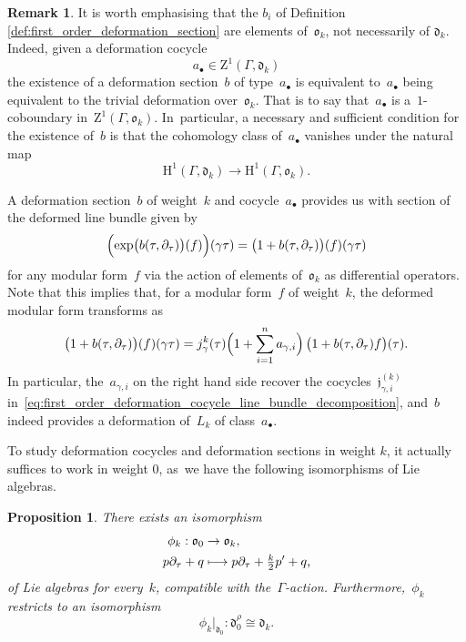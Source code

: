 \documentclass[10pt,a4paper]{article}
\numberwithin{equation}{section}
\let\oldbullet\bullet
\renewcommand{\bullet}{{\scriptscriptstyle\oldbullet}}
\theoremstyle{plain}
\newtheorem{proposition}[theoremcounter]{Proposition}
\theoremstyle{definition}
\newtheorem{remark}[theoremcounter]{Remark}
\newcommand{\tx}{\text}
\newcommand{\nbd}{\nobreakdash-\hspace{0pt}}
\newcommand{\frakd}{\ensuremath{\mathfrak{d}}}
\newcommand{\frakj}{\ensuremath{\mathfrak{j}}}
\newcommand{\frako}{\ensuremath{\mathfrak{o}}}
\newcommand{\rmH}{\ensuremath{\mathrm{H}}}
\newcommand{\rmZ}{\ensuremath{\mathrm{Z}}}
\newcommand{\defcol}{\mathrel{:}}
\let\Ga\Gamma
\let\ga\gamma
\newcommand\mto{\mathchoice{\longmapsto}{\mapsto}{\mapsto}{\mapsto}}
\begin{document}
\begin{remark}
It is worth emphasising that the $b_i$ of Definition \ref{def:first_order_deformation_section} are elements of~$\frako_k$, not necessarily of $\frakd_k$. Indeed, given a deformation cocycle
\begin{equation*}a_\bullet\in \rmZ^1(\Ga,\frakd_k)\end{equation*}
the existence of a deformation section~$b$ of type~$a_\bullet$ is equivalent to~$a_\bullet$ being equivalent to the trivial deformation over~$\frako_k$. That is to say that~$a_\bullet$ is a~$1$-coboundary in~$\rmZ^1(\Ga,\frako_k)$. In~particular, a necessary and sufficient condition for the existence of~$b$ is that the cohomology class of~$a_\bullet$ vanishes under the natural map
\begin{equation*}\rmH^1(\Ga,\frakd_k) \to \rmH^1(\Ga,\frako_k)\tx{.}\end{equation*}
\end{remark}

A deformation section~$b$ of weight~$k$ and cocycle~$a_\bullet$ provides us with section of the deformed line bundle given by
\begin{equation}
\label{eq:first_order_deformation_modular_forms}
\Bigl(\exp\bigl(b(\tau, \partial_\tau) \bigr) (f) \Bigr)(\ga\tau)
=
\bigl(1 + b(\tau, \partial_\tau) \bigr)(f)(\ga\tau)
\end{equation}
for any modular form~$f$ via the action of elements of~$\frako_k$ as differential operators. Note that this implies that, for a modular form~$f$ of weight~$k$, the deformed modular form transforms as
\begin{equation*}
\bigl(1 + b(\tau, \partial_\tau) \bigr)(f)(\ga\tau)
=
j_\gamma^{k}(\tau) \Bigl(1+\sum_{i=1}^n a_{\ga,i}\Bigr)\, \bigl(1+ b(\tau,\partial_\tau) f \bigr)(\tau)
\tx{.}
\end{equation*}
In particular, the~$a_{\ga,i}$ on the right hand side recover the cocycles~$\frakj^{(k)}_{\ga,i}$ in~\eqref{eq:first_order_deformation_cocycle_line_bundle_decomposition}, and~$b$ indeed provides a deformation of~$L_k$ of class~$a_\bullet$.

To study deformation cocycles and deformation sections in weight $k$, it actually suffices to work in weight $0$, as~we have the following isomorphisms of Lie algebras.


\begin{proposition}
\label{prop:weight-indep}
There exists an isomorphism
\begin{align*}
\phi_k \defcol
\frako_0 &\to \frako_k
\tx{,}\\
p\partial_\tau + q &\mto p\partial_\tau + \tfrac{k}{2}p^\prime + q
\tx{,}
\end{align*}
of Lie algebras for every~$k$, compatible with the~$\Ga$\nbd{}action. Furthermore,~$\phi_k$ restricts to an isomorphism
\begin{equation*}
\phi_k \big|_{\frakd_0} \defcol \frakd_0^\rho\cong\frakd_k
\tx{.}
\end{equation*}
\end{proposition}
\end{document}
